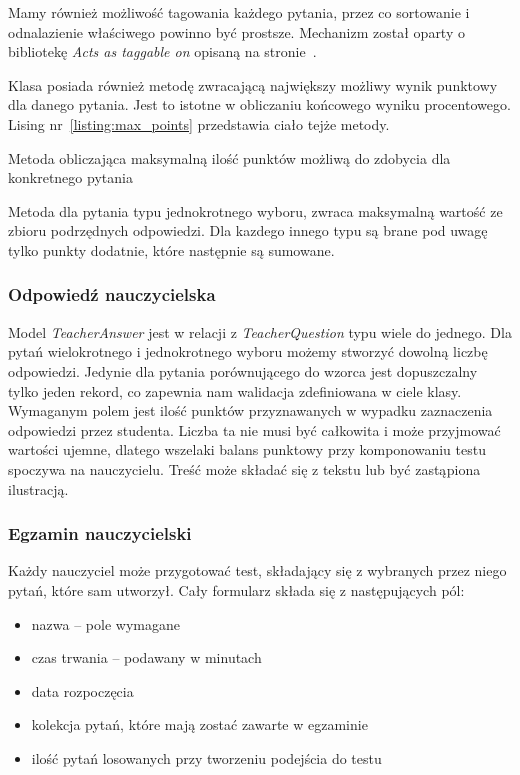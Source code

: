 \documentclass[a4paper,12pt]{article}
\begin{document}
Mamy również możliwość tagowania każdego pytania, przez co sortowanie i odnalazienie
właściwego powinno być prostsze. Mechanizm został oparty o bibliotekę \emph{Acts as taggable
on} opisaną na stronie~\pageref{sec:acts_as_taggable_on}.


Klasa posiada również metodę zwracającą największy możliwy wynik punktowy dla danego
pytania. Jest to istotne w obliczaniu końcowego wyniku procentowego. Lising
nr~\ref{listing:max_points} przedstawia ciało tejże metody.

\begin{listing}
  
  \caption{Metoda obliczająca maksymalną ilość punktów możliwą do zdobycia dla konkretnego pytania}
  \label{listing:max_points}
\end{listing}


Metoda dla pytania typu jednokrotnego wyboru, zwraca maksymalną wartość ze zbioru
podrzędnych odpowiedzi. Dla kazdego innego typu są brane pod uwagę tylko punkty dodatnie,
które następnie są sumowane.

\subsubsection{Odpowiedź nauczycielska}
Model \emph{TeacherAnswer} jest w relacji z \emph{TeacherQuestion} typu wiele do jednego.
Dla pytań wielokrotnego i jednokrotnego wyboru możemy stworzyć dowolną liczbę odpowiedzi.
Jedynie dla pytania porównującego do wzorca jest dopuszczalny tylko jeden rekord, co
zapewnia nam walidacja zdefiniowana w ciele klasy. Wymaganym polem jest ilość punktów
przyznawanych w wypadku zaznaczenia odpowiedzi przez studenta. Liczba ta nie musi być
całkowita i może przyjmować wartości ujemne, dlatego wszelaki balans punktowy przy
komponowaniu testu spoczywa na nauczycielu. Treść może składać się z tekstu lub być
zastąpiona ilustracją.

\subsubsection{Egzamin nauczycielski}
Każdy nauczyciel może przygotować test, składający się z wybranych przez niego pytań,
które sam utworzył. Cały formularz składa się z następujących pól:

\begin{itemize}
  \item{nazwa -- pole wymagane}
  \item{czas trwania -- podawany w minutach}
  \item{data rozpoczęcia}
  \item{kolekcja pytań, które mają zostać zawarte w egzaminie}
  \item{ilość pytań losowanych przy tworzeniu podejścia do testu}
\end{itemize}
\end{document}

